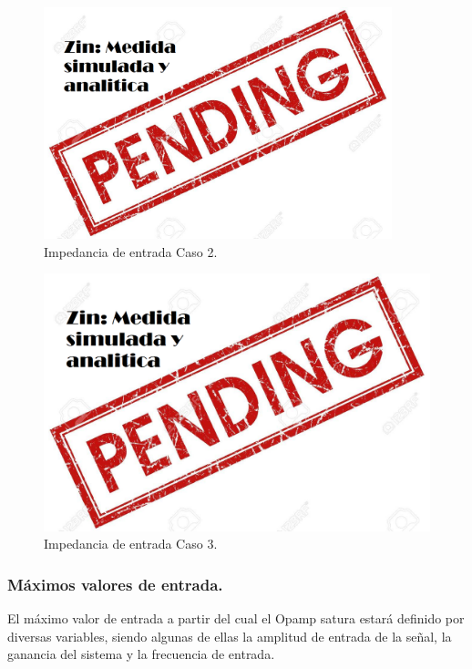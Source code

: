 \begin{figure}[H]	
	\centering
	\includegraphics[width=0.9\textwidth]{Ejercicio1/Imagenes/CZinC2.png}
	\caption{Impedancia de entrada Caso 2.}
	\label{fig:CompZinC2}
\end{figure} 
\begin{figure}[H]	
	\centering
	\includegraphics[width=\textwidth]{Ejercicio1/Imagenes/CZinC3.png}
	\caption{Impedancia de entrada Caso 3.}
	\label{fig:CompZinC3}
\end{figure} 
\subsubsection{Máximos valores de entrada.}
El máximo valor de entrada a partir del cual el Opamp satura estará definido por diversas variables, siendo algunas de ellas la amplitud de entrada de la señal, la ganancia del sistema y la frecuencia de entrada.

